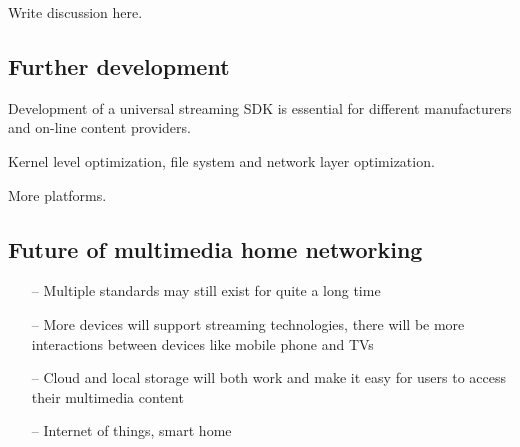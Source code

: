 
Write discussion here.

\subsection{Further development}
Development of a universal streaming SDK is essential for different
manufacturers and on-line content providers.

Kernel level optimization, file system and network layer optimization.

More platforms.
\subsection{Future of multimedia home networking}
\begin{itemize}
\item[--] Multiple standards may still exist for quite a long time
\item[--] More devices will support streaming technologies, there will be more interactions between devices like mobile phone and TVs
\item[--] Cloud and local storage will both work and make it easy for users to access their multimedia content
\item[--] Internet of things, smart home
\end{itemize}